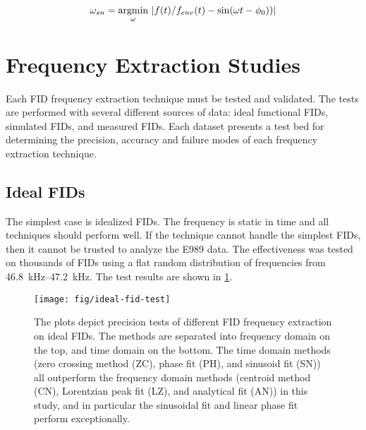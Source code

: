 \begin{equation}
\label{eqn:freq-sn}
\omega_{sn} = \operatorname*{argmin}_\omega \; \\
\left| f(t) / f_{env}(t) - \sin(\omega t - \phi_0)) \right|
\end{equation}

\section{Frequency Extraction Studies}

Each FID frequency extraction technique must be tested and validated.  The tests are performed with several different sources of data: ideal functional FIDs, simulated FIDs, and measured FIDs.  Each dataset presents a test bed for determining the precision, accuracy and failure modes of each frequency extraction technique.

\subsection{Ideal FIDs}
The simplest case is idealized FIDs. The frequency is static in time and all techniques should perform well.  If the technique cannot handle the simplest FIDs, then it cannot be trusted to analyze the E989 data.  The effectiveness was tested on thousands of FIDs using a flat random distribution of frequencies from \SIrange{46.8}{47.2}{\kHz}.  The test results are shown in \ref{fig:fid-ideal-freq-extraction}.

\begin{figure}
\centering
\texttt{[image: fig/ideal-fid-test]}
\caption{
    The plots depict precision tests of different FID frequency extraction on ideal FIDs.  The methods are separated into frequency domain on the top, and time domain on the bottom.  The time domain methods (zero crossing method (ZC), phase fit (PH), and sinusoid fit (SN)) all outperform the frequency domain methods (centroid method (CN), Lorentzian peak fit (LZ), and analytical fit (AN)) in this study, and in particular the sinusoidal fit and linear phase fit perform exceptionally.
    \label{fig:fid-ideal-freq-extraction}
}
\end{figure}

